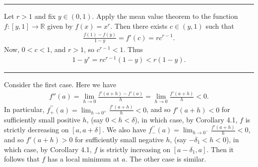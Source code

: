 \documentclass[letterpaper,10pt,english]{jupyterBook}
\begin{document}
\bigskip\hrule\bigskip


\sphinxAtStartPar
{\hyperref[\detokenize{Problems:id52}]{}} Let \(r>1\) and fix \(y\in (0,1)\). Apply the mean value theorem to the function \(f:[y,1]\to\mathbb{R}\) given by \(f(x) = x^r\). Then there exists \(c \in (y, 1)\) such that
\begin{equation*}
\begin{split}
\frac{f(1)-f(y)}{1-y}=f'(c)=rc^{r-1}.
\end{split}
\end{equation*}
\sphinxAtStartPar
Now, \(0<c<1\), and \(r>1\), so \(c^{r-1}<1\). Thus
\begin{equation*}
\begin{split}
1 - y^r = rc^{r-1}( 1- y) < r(1 - y).
\end{split}
\end{equation*}

\bigskip\hrule\bigskip


\sphinxAtStartPar
{\hyperref[\detokenize{Problems:id53}]{}} Consider the first case. Here we have
\begin{equation*}
\begin{split}
f''(a) = \lim_{h \rightarrow 0}\frac{f'(a + h) - f'(a)}{h} =  \lim_{h \rightarrow 0}\frac{f'(a + h)}{h} < 0.
\end{split}
\end{equation*}
\sphinxAtStartPar
In particular, \(f^{\prime \prime}_{+}(a) = \lim_{h \rightarrow 0^+}\frac{f'(a + h)}{h} < 0\), and so \(f'(a + h) < 0\) for sufficiently small positive \(h\), (say \(0 < h < \delta\)), in which case, by Corollary 4.1, \(f\) is strictly decreasing on \([a,  a + \delta]\). We also have \(f^{\prime \prime}_{-}(a) = \lim_{h \rightarrow 0^-}\frac{f'(a + h)}{h} < 0\), and so \(f'(a + h) > 0\) for sufficiently small negative \(h\), (say \(-\delta_{1} < h < 0\)), in which case, by Corollary 4.1, \(f\) is strictly increasing on \([a- \delta_{1}, a]\). Then it follows that \(f\) has a local minimum at \(a\). The other case is similar.
\end{document}
